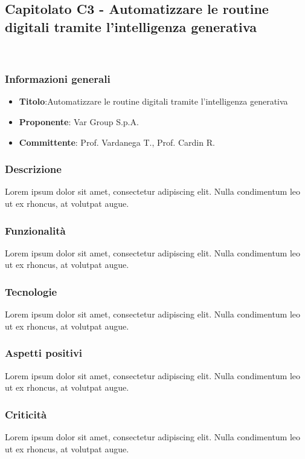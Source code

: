 \subsection{Capitolato C3 - Automatizzare le routine digitali tramite l’intelligenza generativa}
    \ \subsubsection{Informazioni generali}
        \begin{itemize}
            \item \textbf{Titolo}:Automatizzare le routine digitali tramite l’intelligenza generativa
            \item \textbf{Proponente}: Var Group S.p.A.
            \item \textbf{Committente}: Prof. Vardanega T., Prof. Cardin R.
        \end{itemize}
     \subsubsection{Descrizione}
    Lorem ipsum dolor sit amet, consectetur adipiscing elit. Nulla condimentum leo ut ex rhoncus, at volutpat augue.
     \subsubsection{Funzionalità}
    Lorem ipsum dolor sit amet, consectetur adipiscing elit. Nulla condimentum leo ut ex rhoncus, at volutpat augue.
    \subsubsection{Tecnologie}
    Lorem ipsum dolor sit amet, consectetur adipiscing elit. Nulla condimentum leo ut ex rhoncus, at volutpat augue.
    \subsubsection{Aspetti positivi}
    Lorem ipsum dolor sit amet, consectetur adipiscing elit. Nulla condimentum leo ut ex rhoncus, at volutpat augue.
    \subsubsection{Criticità}
    Lorem ipsum dolor sit amet, consectetur adipiscing elit. Nulla condimentum leo ut ex rhoncus, at volutpat augue.